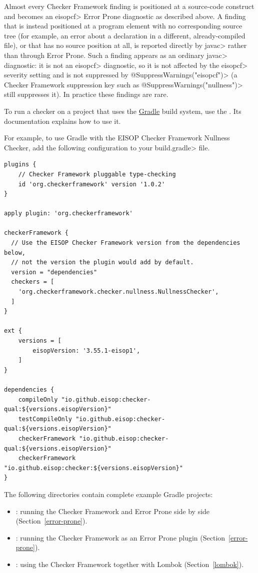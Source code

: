 
Almost every Checker Framework finding is positioned at a source-code construct and becomes
an \<eisopcf> Error Prone diagnostic as described above.  A finding that is instead positioned
at a program element with no corresponding source tree (for example, an error about a
declaration in a different, already-compiled file), or that has no source position at all, is
reported directly by \<javac> rather than through Error Prone.  Such a finding appears as an
ordinary \<javac> diagnostic: it is not an \<eisopcf> diagnostic, so it is not affected by the
\<eisopcf> severity setting and is not suppressed by \<@SuppressWarnings("eisopcf")> (a Checker
Framework suppression key such as \<@SuppressWarnings("nullness")> still suppresses it).  In
practice these findings are rare.



To run a checker
on a project that uses the \href{https://gradle.org/}{Gradle} build system,
use the
.  Its documentation explains how to use it.

For example, to use Gradle with the EISOP Checker Framework Nullness Checker,
add the following configuration to your \<build.gradle> file.
\begin{Verbatim}
plugins {
    // Checker Framework pluggable type-checking
    id 'org.checkerframework' version '1.0.2'
}

apply plugin: 'org.checkerframework'

checkerFramework {
  // Use the EISOP Checker Framework version from the dependencies below,
  // not the version the plugin would add by default.
  version = "dependencies"
  checkers = [
    'org.checkerframework.checker.nullness.NullnessChecker',
  ]
}

ext {
    versions = [
        eisopVersion: '3.55.1-eisop1',
    ]
}

dependencies {
    compileOnly "io.github.eisop:checker-qual:${versions.eisopVersion}"
    testCompileOnly "io.github.eisop:checker-qual:${versions.eisopVersion}"
    checkerFramework "io.github.eisop:checker-qual:${versions.eisopVersion}"
    checkerFramework "io.github.eisop:checker:${versions.eisopVersion}"
}
\end{Verbatim}

The following directories contain complete example Gradle projects:
\begin{itemize}
\item {}:  running the Checker Framework and Error Prone
  side by side (Section~\ref{error-prone}).
\item {}:  running the Checker Framework as an Error
  Prone plugin (Section~\ref{error-prone}).
\item {}:  using the Checker Framework together with Lombok
  (Section~\ref{lombok}).
\end{itemize}


